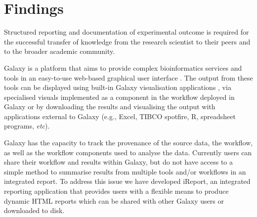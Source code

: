 \section{Findings}

Structured reporting and documentation of experimental outcome is required for the successful transfer of knowledge from the research scientist to their peers and to the broader academic community.

Galaxy is a platform that aims to provide complex bioinformatics services and tools in an easy-to-use web-based graphical user interface \cite{goecks2010galaxy,blankenberg2010galaxy,giardine2005galaxy}. The output from these tools can be displayed using built-in Galaxy visualisation applications \cite{goecks}, via specialised visuals implemented as a component in the workflow deployed in Galaxy \cite{cgtag} or by downloading the results and visualising the output with applications external to Galaxy (e.g., Excel, TIBCO spotfire, R, spreadsheet programs, \emph{etc}).

Galaxy has the capacity to track the provenance of the source data, the workflow, as well as the workflow components used to analyse the data. Currently users can share their workflow and results within Galaxy, but do not have access to a simple method to summarise results from multiple tools and/or workflows in an integrated report. To address this issue we have developed iReport, an integrated reporting application that provides users with a flexible means to produce dynamic HTML reports which can be shared with other Galaxy users or downloaded to disk.

